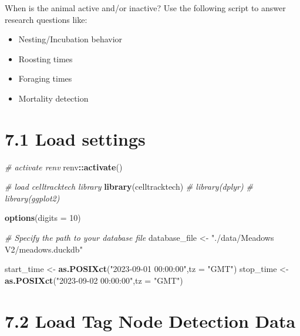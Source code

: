 \documentclass[
]{book}
\newenvironment{Shaded}{\begin{snugshade}}{\end{snugshade}}
\newcommand{\AttributeTok}[1]{\textcolor[rgb]{0.13,0.29,0.53}{#1}}
\newcommand{\CommentTok}[1]{\textcolor[rgb]{0.56,0.35,0.01}{\textit{#1}}}
\newcommand{\DecValTok}[1]{\textcolor[rgb]{0.00,0.00,0.81}{#1}}
\newcommand{\FunctionTok}[1]{\textcolor[rgb]{0.13,0.29,0.53}{\textbf{#1}}}
\newcommand{\NormalTok}[1]{#1}
\newcommand{\OtherTok}[1]{\textcolor[rgb]{0.56,0.35,0.01}{#1}}
\newcommand{\SpecialCharTok}[1]{\textcolor[rgb]{0.81,0.36,0.00}{\textbf{#1}}}
\newcommand{\StringTok}[1]{\textcolor[rgb]{0.31,0.60,0.02}{#1}}
\providecommand{\tightlist}{%
  \setlength{\itemsep}{0pt}\setlength{\parskip}{0pt}}
\begin{document}
When is the animal active and/or inactive? Use the following script to answer research questions like:

\begin{itemize}
\tightlist
\item
  Nesting/Incubation behavior
\item
  Roosting times
\item
  Foraging times
\item
  Mortality detection
\end{itemize}

\section{7.1 Load settings}\label{load-settings-1}

\begin{Shaded}
\begin{Highlighting}[]
\CommentTok{\# activate renv}
\NormalTok{renv}\SpecialCharTok{::}\FunctionTok{activate}\NormalTok{()}
\end{Highlighting}
\end{Shaded}

\begin{Shaded}
\begin{Highlighting}[]
\CommentTok{\# load celltracktech library}
\FunctionTok{library}\NormalTok{(celltracktech)}
\CommentTok{\# library(dplyr)}
\CommentTok{\# library(ggplot2)}

\FunctionTok{options}\NormalTok{(}\AttributeTok{digits =} \DecValTok{10}\NormalTok{)}

\CommentTok{\# Specify the path to your database file}
\NormalTok{database\_file }\OtherTok{\textless{}{-}} \StringTok{"./data/Meadows V2/meadows.duckdb"}

\NormalTok{start\_time }\OtherTok{\textless{}{-}} \FunctionTok{as.POSIXct}\NormalTok{(}\StringTok{"2023{-}09{-}01 00:00:00"}\NormalTok{,}\AttributeTok{tz =} \StringTok{"GMT"}\NormalTok{)}
\NormalTok{stop\_time }\OtherTok{\textless{}{-}} \FunctionTok{as.POSIXct}\NormalTok{(}\StringTok{"2023{-}09{-}02 00:00:00"}\NormalTok{,}\AttributeTok{tz =} \StringTok{"GMT"}\NormalTok{)}
\end{Highlighting}
\end{Shaded}

\section{7.2 Load Tag Node Detection Data}\label{load-tag-node-detection-data}
\end{document}
